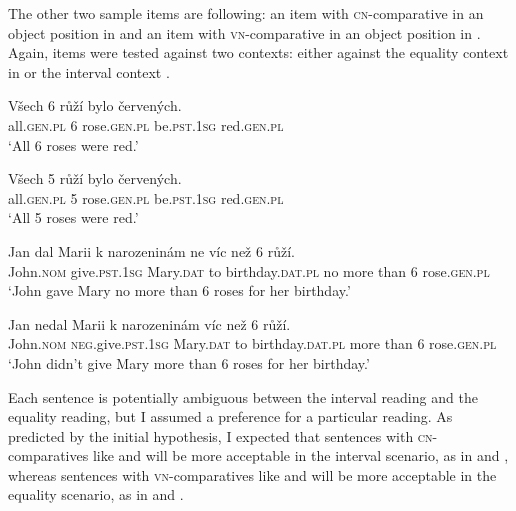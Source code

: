 \documentclass[output=paper,
]{langscibook}
\begin{document}
\noindent The other two sample items are following: an item with \textsc{cn-}comparative in an object position in  and an item with \textsc{vn-}comparative in an object position in . Again, items were tested against two contexts: either against the equality context in  or the interval context . 

\ea 
\gll Všech 6 růží bylo červených.\\
all.\textsc{gen.pl} 6 rose.\textsc{gen.pl} be.\textsc{pst.1sg} red.\textsc{gen.pl}\\\hfill{}
\glt `All 6 roses were red.'  \label{ex:rose_e}
\z

\ea 
\gll Všech 5 růží bylo červených.\\
all.\textsc{gen.pl} 5 rose.\textsc{gen.pl} be.\textsc{pst.1sg} red.\textsc{gen.pl}\\\hfill{}
\glt `All 5 roses were red.'  \label{ex:rose_n}
\z

\ea
\gll Jan dal Marii k narozeninám ne víc než 6 růží.\label{ex:ocn}\\
John.\textsc{nom} give.\textsc{pst.1sg} Mary.\textsc{dat} to birthday.\textsc{dat.pl} no more than 6 rose.\textsc{gen.pl}\\\hfill {}
\glt `John gave Mary no more than 6 roses for her birthday.'
\z

\ea
\gll Jan nedal Marii k narozeninám víc než 6 růží.\label{ex:ovn}\\
John.\textsc{nom} \textsc{neg}.give.\textsc{pst.1sg} Mary.\textsc{dat} to birthday.\textsc{dat.pl} more than 6 rose.\textsc{gen.pl}\\\hfill{}
\glt`John didn't give Mary more than 6 roses for her birthday.'
\z


\noindent Each sentence is potentially ambiguous between the interval reading and the equality reading, but I assumed a preference for a particular reading. As predicted by the initial hypothesis, I expected that sentences with \textsc{cn-}comparatives like  and  will be more acceptable in the interval scenario, as in  and , whereas sentences with \textsc{vn-}comparatives like  and  will be more acceptable in the equality scenario, as in  and .
\end{document}

